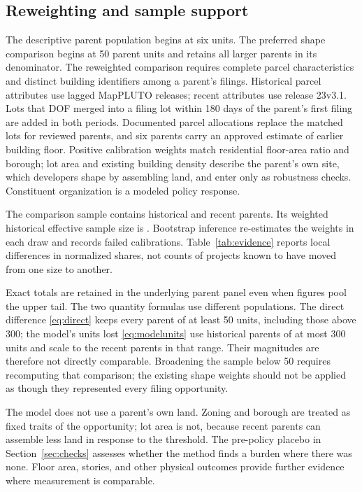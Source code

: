 \documentclass[11pt]{article}
\begin{document}
\subsection{Reweighting and sample support}
The descriptive parent population begins at six units. The preferred shape comparison begins at 50 parent units and retains all larger parents in its denominator. The reweighted comparison requires complete parcel characteristics and distinct building identifiers among a parent's filings. Historical parcel attributes use lagged MapPLUTO releases; recent attributes use release 23v3.1. Lots that DOF merged into a filing lot within 180 days of the parent's first filing are added in both periods. Documented parcel allocations replace the matched lots for reviewed parents, and six parents carry an approved estimate of earlier building floor. Positive calibration weights match residential floor-area ratio and borough; lot area and existing building density describe the parent's own site, which developers shape by assembling land, and enter only as robustness checks. Constituent organization is a modeled policy response.

The comparison sample contains \CalibrationHistoricalParents{} historical and \CalibrationPostParents{} recent parents. Its weighted historical effective sample size is \CalibrationESS{}. Bootstrap inference re-estimates the weights in each draw and records failed calibrations. Table~\ref{tab:evidence} reports local differences in normalized shares, not counts of projects known to have moved from one size to another.

Exact totals are retained in the underlying parent panel even when figures pool the upper tail. The two quantity formulas use different populations. The direct difference \eqref{eq:direct} keeps every parent of at least 50 units, including those above 300; the model's units lost \eqref{eq:modelunits} use historical parents of at most 300 units and scale to the \ModelPostParents{} recent parents in that range. Their magnitudes are therefore not directly comparable. Broadening the sample below 50 requires recomputing that comparison; the existing shape weights should not be applied as though they represented every filing opportunity.

The model does not use a parent's own land. Zoning and borough are treated as fixed traits of the opportunity; lot area is not, because recent parents can assemble less land in response to the threshold. The pre-policy placebo in Section~\ref{sec:checks} assesses whether the method finds a burden where there was none. Floor area, stories, and other physical outcomes provide further evidence where measurement is comparable.
\end{document}
